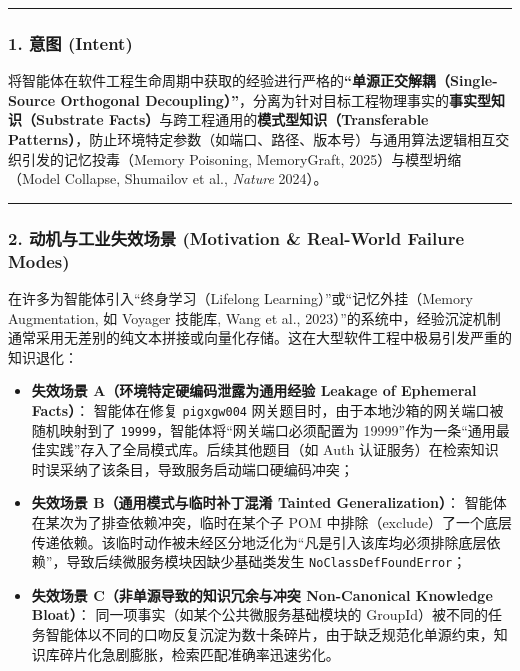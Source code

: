 \documentclass[
]{ctexart}
\providecommand{\tightlist}{%
  \setlength{\itemsep}{0pt}\setlength{\parskip}{0pt}}
\renewcommand{\_}{\discretionary{}{}{\textunderscore}}
\begin{document}
\begin{center}\rule{0.5\linewidth}{0.5pt}\end{center}

\subsubsection{1. 意图 (Intent)}\label{ux610fux56fe-intent-12}

将智能体在软件工程生命周期中获取的经验进行严格的\textbf{``单源正交解耦（Single-Source
Orthogonal
Decoupling）''}，分离为针对目标工程物理事实的\textbf{事实型知识（Substrate
Facts）}与跨工程通用的\textbf{模式型知识（Transferable
Patterns）}，防止环境特定参数（如端口、路径、版本号）与通用算法逻辑相互交织引发的记忆投毒（Memory
Poisoning, MemoryGraft, 2025）与模型坍缩（Model Collapse, Shumailov et
al., \emph{Nature} 2024）。

\begin{center}\rule{0.5\linewidth}{0.5pt}\end{center}

\subsubsection{2. 动机与工业失效场景 (Motivation \& Real-World Failure
Modes)}\label{ux52a8ux673aux4e0eux5de5ux4e1aux5931ux6548ux573aux666f-motivation-real-world-failure-modes-12}

在许多为智能体引入``终身学习（Lifelong Learning）''或``记忆外挂（Memory
Augmentation, 如 Voyager 技能库, Wang et al.,
2023）''的系统中，经验沉淀机制通常采用无差别的纯文本拼接或向量化存储。这在大型软件工程中极易引发严重的知识退化：

\begin{itemize}
\tightlist
\item
  \textbf{失效场景 A（环境特定硬编码泄露为通用经验 Leakage of Ephemeral
  Facts）}： 智能体在修复 \texttt{pigx\_\_gw\_\_004}
  网关题目时，由于本地沙箱的网关端口被随机映射到了
  \texttt{19999}，智能体将``网关端口必须配置为
  19999''作为一条``通用最佳实践''存入了全局模式库。后续其他题目（如 Auth
  认证服务）在检索知识时误采纳了该条目，导致服务启动端口硬编码冲突；
\item
  \textbf{失效场景 B（通用模式与临时补丁混淆 Tainted Generalization）}：
  智能体在某次为了排查依赖冲突，临时在某个子 POM
  中排除（exclude）了一个底层传递依赖。该临时动作被未经区分地泛化为``凡是引入该库均必须排除底层依赖''，导致后续微服务模块因缺少基础类发生
  \texttt{NoClassDefFoundError}；
\item
  \textbf{失效场景 C（非单源导致的知识冗余与冲突 Non-Canonical Knowledge
  Bloat）}： 同一项事实（如某个公共微服务基础模块的
  GroupId）被不同的任务智能体以不同的口吻反复沉淀为数十条碎片，由于缺乏规范化单源约束，知识库碎片化急剧膨胀，检索匹配准确率迅速劣化。
\end{itemize}
\end{document}

